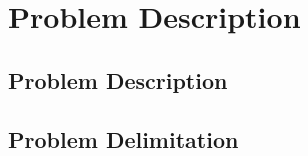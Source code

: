 \chapter{Problem Description}\label{ch:probdesc}

\section{Problem Description}

\section{Problem Delimitation}